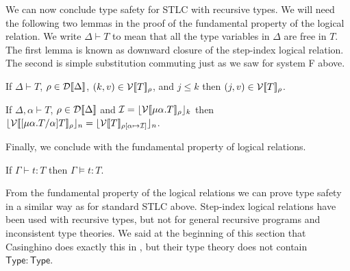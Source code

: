 We can now conclude type safety for STLC with recursive types.  We
will need the following two lemmas in the proof of the fundamental
property of the logical relation.  We write $\Delta \vdash T$ to mean
that all the type variables in $\Delta$ are free in $T$.  The first
lemma is known as downward closure of the step-index logical relation.
The second is simple substitution commuting just as we saw for system
F above.
\begin{lemma}
  \label{lemma:1}
  If $\Delta \vdash T$, $\rho \in \mathcal{D}[\negthinspace[\Delta]\negthinspace]$, $(k,v) \in \mathcal{V}[\negthinspace[T]\negthinspace]_\rho$, and
  $j \leq k$ then $(j,v) \in \mathcal{V}[\negthinspace[T]\negthinspace]_\rho$.
\end{lemma}

\begin{lemma}
  \label{lemma:2}
  If $\Delta, \alpha \vdash T$, $\rho \in \mathcal{D}[\negthinspace[\Delta]\negthinspace]$ and $\mathcal{I} = \lfloor \mathcal{V}[\negthinspace[\mu \alpha . T]\negthinspace]_\rho \rfloor_{k}$ then
  $\lfloor \mathcal{V}[\negthinspace[[\mu \alpha.T/\alpha]T]\negthinspace]_\rho \rfloor_{n} = \lfloor \mathcal{V}[\negthinspace[T]\negthinspace]_{\rho[\alpha \mapsto \mathcal{I}]} \rfloor_{n}$.
\end{lemma}

\noindent
Finally, we conclude with the fundamental property of logical relations.
\begin{thm}
  \label{thm:fundamental_property}
  If $\Gamma \vdash t : T$ then $\Gamma \models t:T$.
\end{thm}

From the fundamental property of the logical relations we can prove
type safety in a similar way as for standard STLC above.  Step-index
logical relations have been used with recursive types, but not for
general recursive programs and inconsistent type theories.  We said at
the beginning of this section that Casinghino does exactly this in
\cite{Casinghino:2012}, but their type theory does not contain
$\mathsf{Type:Type}$.
